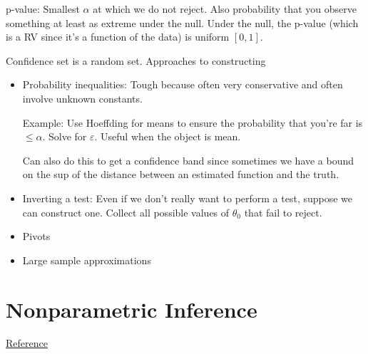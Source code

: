 \documentclass[12pt]{article}
\theoremstyle{plain}
\theoremstyle{definition}
\theoremstyle{remark}
\begin{document}
p-value: Smallest $\alpha$ at which we do not reject.
Also probability that you observe something at least as extreme under
the null.
Under the null, the p-value (which is a RV since it's a function of the
data) is uniform $[0,1]$.


Confidence set is a random set.
Approaches to constructing
\begin{itemize}
  \item Probability inequalities:
    Tough because often very conservative and often involve unknown
    constants.

    Example: Use Hoeffding for means to ensure the probability that
    you're far is $\leq \alpha$. Solve for $\varepsilon$.
    Useful when the object is mean.

    Can also do this to get a confidence band since sometimes we have a
    bound on the sup of the distance between an estimated function and
    the truth.

  \item Inverting a test:
    Even if we don't really want to perform a test, suppose we can
    construct one. Collect all possible values of $\theta_0$ that fail
    to reject.

  \item Pivots
  \item Large sample approximations
\end{itemize}



\clearpage
\section{Nonparametric Inference}

\href{http://www.stat.cmu.edu/~larry/=stat705/Lecture12.pdf}{Reference}
\end{document}
